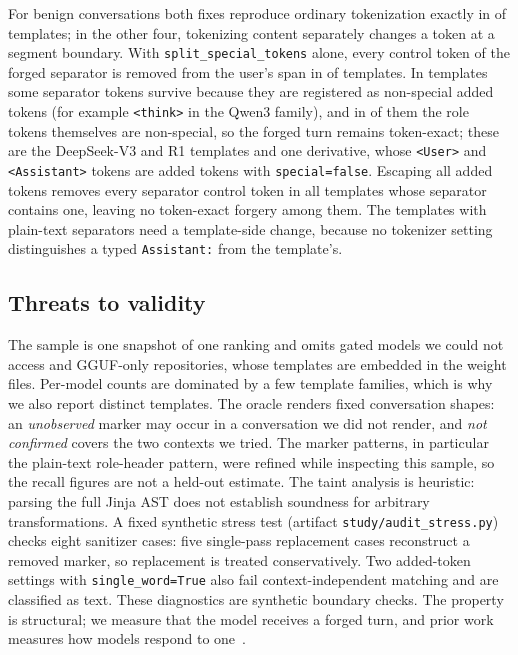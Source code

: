 \documentclass[10pt,conference]{IEEEtran}
\begin{document}
For benign conversations both fixes reproduce ordinary tokenization exactly in
\MitBenignIdentical{} of \MitBenignEvaluated{} templates; in the other four,
tokenizing content separately changes a token at a segment boundary. With
\texttt{split\_special\_tokens} alone, every control token of the forged
separator is removed from the user's span in \MitBlockedSplit{} of
\MitForgeable{} templates. In \MitResidualSplit{} templates some separator
tokens survive because they are registered as non-special added tokens (for
example \texttt{<think>} in the Qwen3 family), and in
\MitExactAfterSplitNonPlain{} of them the role
tokens themselves are non-special, so the forged turn remains token-exact;
these are the DeepSeek-V3 and R1 templates and one derivative, whose
\texttt{<\textbar{}User\textbar{}>} and \texttt{<\textbar{}Assistant\textbar{}>}
tokens are added tokens with \texttt{special=false}.
Escaping all added tokens removes every separator control token in all
\MitBlockedEscape{} templates whose separator contains one, leaving no
token-exact forgery among them. The \MitPlainText{} templates with plain-text
separators need a template-side change, because no tokenizer setting
distinguishes a typed \texttt{Assistant:} from the template's.

\subsection{Threats to validity}

The sample is one snapshot of one ranking and omits gated models we could not
access and GGUF-only repositories, whose templates are embedded in the weight
files. Per-model counts are dominated by a few template families, which is why
we also report distinct templates. The oracle renders fixed conversation
shapes: an \emph{unobserved} marker may occur in a conversation we did not
render, and \emph{not confirmed} covers the two contexts we tried. The marker
patterns, in particular the plain-text role-header pattern, were refined while
inspecting this sample, so the recall figures are not a held-out estimate. The taint analysis is heuristic: parsing the full Jinja AST does not establish
soundness for arbitrary transformations. A fixed synthetic stress test
(artifact \texttt{study/audit\_stress.py}) checks eight sanitizer cases:
five single-pass replacement cases reconstruct a removed marker, so replacement
is treated conservatively. Two added-token settings with
\texttt{single\_word=True} also fail context-independent matching and are
classified as text. These diagnostics are synthetic boundary checks. The
property is structural; we measure that the model receives a forged turn, and
prior work measures how models respond to one~\cite{jiang2025chatbug,zhou2024virtual}.
\end{document}
